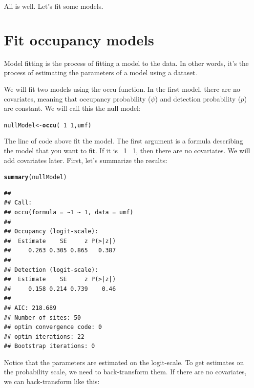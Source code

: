 \documentclass[12pt]{article}\usepackage[]{graphicx}\usepackage[]{color}
\makeatletter
\newcommand{\hlnum}[1]{\textcolor[rgb]{0.686,0.059,0.569}{#1}}%
\newcommand{\hlopt}[1]{\textcolor[rgb]{0,0,0}{#1}}%
\newcommand{\hlstd}[1]{\textcolor[rgb]{0.345,0.345,0.345}{#1}}%
\newcommand{\hlkwb}[1]{\textcolor[rgb]{0.69,0.353,0.396}{#1}}%
\newcommand{\hlkwd}[1]{\textcolor[rgb]{0.737,0.353,0.396}{\textbf{#1}}}%
\newenvironment{kframe}{%
 \def\at@end@of@kframe{}%
 \ifinner\ifhmode%
  \def\at@end@of@kframe{\end{minipage}}%
  \begin{minipage}{\columnwidth}%
 \fi\fi%
 \def\FrameCommand##1{\hskip\@totalleftmargin \hskip-\fboxsep
 \colorbox{shadecolor}{##1}\hskip-\fboxsep
     \hskip-\linewidth \hskip-\@totalleftmargin \hskip\columnwidth}%
 \MakeFramed {\advance\hsize-\width
   \@totalleftmargin\z@ \linewidth\hsize
   \@setminipage}}%
 {\par\unskip\endMakeFramed%
 \at@end@of@kframe}
\newenvironment{knitrout}{}{} %
\makeatother
\begin{document}
All is well. Let's fit some models. 



\section*{Fit occupancy models}

Model fitting is the process of fitting a model to the data. In other words, it's the process of estimating the parameters of a model using a dataset.

We will fit two models using the {occu} function. In the first model, there are no covariates, meaning that occupancy probability ($\psi$) and detection probability ($p$) are constant. We will call this the null model:

\begin{knitrout}
\color{fgcolor}\begin{kframe}
\begin{alltt}
\hlstd{nullModel} \hlkwb{<-} \hlkwd{occu}\hlstd{(}\hlopt{~}\hlnum{1} \hlopt{~}\hlnum{1}\hlstd{, umf)}
\end{alltt}
\end{kframe}
\end{knitrout}

The line of code above fit the model. The first argument is a formula describing the model that you want to fit. If it is {~1 ~1}, then there are no covariates. We will add covariates later. First, let's summarize the results:


\begin{knitrout}
\color{fgcolor}\begin{kframe}
\begin{alltt}
\hlkwd{summary}\hlstd{(nullModel)}
\end{alltt}
\begin{verbatim}
## 
## Call:
## occu(formula = ~1 ~ 1, data = umf)
## 
## Occupancy (logit-scale):
##  Estimate    SE     z P(>|z|)
##     0.263 0.305 0.865   0.387
## 
## Detection (logit-scale):
##  Estimate    SE     z P(>|z|)
##     0.158 0.214 0.739    0.46
## 
## AIC: 218.689 
## Number of sites: 50
## optim convergence code: 0
## optim iterations: 22 
## Bootstrap iterations: 0
\end{verbatim}
\end{kframe}
\end{knitrout}

Notice that the parameters are estimated on the logit-scale. To get estimates on the probability scale, we need to back-transform them. If there are no covariates, we can back-transform like this:
\end{document}

